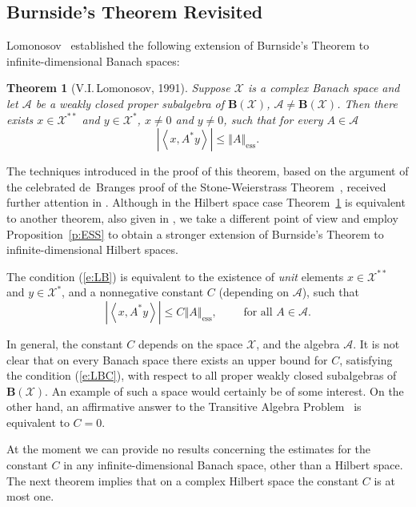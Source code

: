 \documentclass{tran-l}
\newtheorem{thm}{Theorem}[subsection]
\theoremstyle{definition}
\theoremstyle{remark}
\numberwithin{equation}{subsection}
\DeclareMathOperator{\ess}{ess}
\newcommand{\A}{\mathcal{A}}
\newcommand{\X}{\mathcal{X}}
\newcommand{\BOP}{\mathbf{B}}
\newcommand{\abs}[1]{\left\vert#1\right\vert}
\newcommand{\seq}[1]{\left<#1\right>}
\newcommand{\norm}[1]{\left\Vert#1\right\Vert}
\newcommand{\essnorm}[1]{\norm{#1}_{\ess}}
\begin{document}
\subsection{Burnside's Theorem Revisited}
Lomonosov~\cite{Lom91} established the following extension of Burnside's Theorem to infinite-dimensional Banach spaces:

\begin{thm}[V.I.\,Lomonosov, 1991]\label{t:LOMBUR}
Suppose $\X$ is a complex Banach space and let $\A$ be a weakly closed proper subalgebra of $\BOP(\X)$, $\A\neq\BOP(\X)$. Then there exists $x\in{\X^{**}}$ and $y\in{\X^*}$, $x\neq0$ and $y\neq0$, such that for every $A\in\A$
\begin{equation}\label{e:LB}
  \abs{\seq{x,A^*y}}\leq\essnorm{A}.
\end{equation}
\end{thm}

The techniques introduced in the proof of this theorem, based on the argument of the celebrated de~Branges proof of the Stone-Weierstrass Theorem~\cite{dB59}, received further attention in \cite{AAB95,dB93}. Although in the Hilbert space case Theorem~\ref{t:LOMBUR} is equivalent to another theorem, also given in \cite{Lom91}, we take a different point of view and employ Proposition~\ref{p:ESS} to obtain a stronger extension of Burnside's Theorem to infinite-dimensional Hilbert spaces.

The condition (\ref{e:LB}) is equivalent to the existence of \emph{unit} elements $x\in{\X^{**}}$ and $y\in{\X^*}$, and a nonnegative constant $C$ (depending on $\A$), such that
\begin{equation}\label{e:LBC}
  \abs{\seq{x,A^*y}}\leq C \essnorm{A}, \qquad \text{ for all $A\in\A$}.
\end{equation}

In general, the constant $C$ depends on the space $\X$, and the algebra $\A$. It is not clear that on every Banach space there exists an upper bound for $C$, satisfying the condition (\ref{e:LBC}), with respect to all proper weakly closed subalgebras of $\BOP(\X)$. An example of such a space would certainly be of some interest. On the other hand, an affirmative answer to the Transitive Algebra Problem~\cite{RR73} is equivalent to $C=0$.

At the moment we can provide no results concerning the estimates for the constant $C$ in any infinite-dimensional Banach space, other than a Hilbert space. The next theorem implies that on a complex Hilbert space the constant $C$ is at most one.
\end{document}
